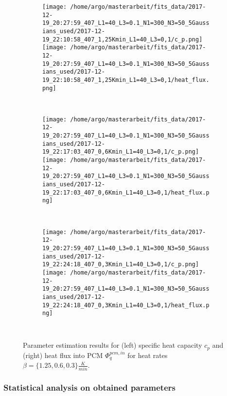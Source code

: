 \documentclass{scrartcl}[12pt, halfparskip]
\numberwithin{equation}{section}
\numberwithin{figure}{section}
\numberwithin{table}{section}
\begin{document}
\begin{figure}[H]
	\begin{subfigure}{1.\textwidth}
		\texttt{[image: /home/argo/masterarbeit/fits\_data/2017-12-19\_20:27:59\_407\_L1=40\_L3=0.1\_N1=300\_N3=50\_5Gaussians\_used/2017-12-19\_22:10:58\_407\_1,25Kmin\_L1=40\_L3=0,1/c\_p.png]}
		\texttt{[image: /home/argo/masterarbeit/fits\_data/2017-12-19\_20:27:59\_407\_L1=40\_L3=0.1\_N1=300\_N3=50\_5Gaussians\_used/2017-12-19\_22:10:58\_407\_1,25Kmin\_L1=40\_L3=0,1/heat\_flux.png]}
	\end{subfigure} \\[1ex]
	
	
	\begin{subfigure}{1.\textwidth}
		\texttt{[image: /home/argo/masterarbeit/fits\_data/2017-12-19\_20:27:59\_407\_L1=40\_L3=0.1\_N1=300\_N3=50\_5Gaussians\_used/2017-12-19\_22:17:03\_407\_0,6Kmin\_L1=40\_L3=0,1/c\_p.png]}
		\texttt{[image: /home/argo/masterarbeit/fits\_data/2017-12-19\_20:27:59\_407\_L1=40\_L3=0.1\_N1=300\_N3=50\_5Gaussians\_used/2017-12-19\_22:17:03\_407\_0,6Kmin\_L1=40\_L3=0,1/heat\_flux.png]}
	\end{subfigure} \\[1ex]
	
	
	\begin{subfigure}{1.\textwidth}
		\texttt{[image: /home/argo/masterarbeit/fits\_data/2017-12-19\_20:27:59\_407\_L1=40\_L3=0.1\_N1=300\_N3=50\_5Gaussians\_used/2017-12-19\_22:24:18\_407\_0,3Kmin\_L1=40\_L3=0,1/c\_p.png]}
		\texttt{[image: /home/argo/masterarbeit/fits\_data/2017-12-19\_20:27:59\_407\_L1=40\_L3=0.1\_N1=300\_N3=50\_5Gaussians\_used/2017-12-19\_22:24:18\_407\_0,3Kmin\_L1=40\_L3=0,1/heat\_flux.png]}
	\end{subfigure} \\[1ex]
	
	

	\caption{Parameter estimation results for (left) specific heat capacity $c_p$ and (right) heat flux into PCM $\varPhi_q^{pcm,in}$ for heat rates $\beta=\{ 1.25, 0.6, 0.3 \} \frac{K}{min}$.}
	\label{fig:optim_c_p_heat_flux_5Gaussians_2}
\end{figure}

\subsubsection{Statistical analysis on obtained parameters}
\end{document}
